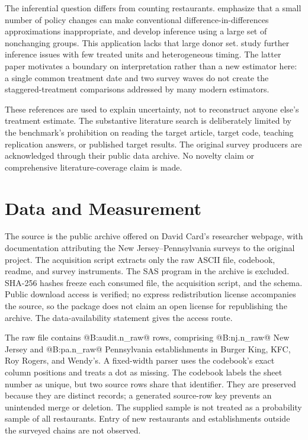 \documentclass[11pt]{article}
\begin{document}
The inferential question differs from counting restaurants. \citet{conley2005} emphasize that a small number of policy changes can make conventional difference-in-differences approximations inappropriate, and develop inference using a large set of nonchanging groups. This application lacks that large donor set. \citet{alvarez2023} study further inference issues with few treated units and heterogeneous timing. The latter paper motivates a boundary on interpretation rather than a new estimator here: a single common treatment date and two survey waves do not create the staggered-treatment comparisons addressed by many modern estimators. %

These references are used to explain uncertainty, not to reconstruct anyone else's treatment estimate. The substantive literature search is deliberately limited by the benchmark's prohibition on reading the target article, target code, teaching replication answers, or published target results. The original survey producers are acknowledged through their public data archive. No novelty claim or comprehensive literature-coverage claim is made. %

\section{Data and Measurement}
The source is the public archive offered on David Card's researcher webpage, with documentation attributing the New Jersey--Pennsylvania surveys to the original project. The acquisition script extracts only the raw ASCII file, codebook, readme, and survey instruments. The SAS program in the archive is excluded. SHA-256 hashes freeze each consumed file, the acquisition script, and the schema. Public download access is verified; no express redistribution license accompanies the source, so the package does not claim an open license for republishing the archive. The data-availability statement gives the access route. %

The raw file contains @B:audit.n_raw@ rows, comprising @B:nj.n_raw@ New Jersey and @B:pa.n_raw@ Pennsylvania establishments in Burger King, KFC, Roy Rogers, and Wendy's. A fixed-width parser uses the codebook's exact column positions and treats a dot as missing. The codebook labels the sheet number as unique, but two source rows share that identifier. They are preserved because they are distinct records; a generated source-row key prevents an unintended merge or deletion. The supplied sample is not treated as a probability sample of all restaurants. Entry of new restaurants and establishments outside the surveyed chains are not observed. %
\end{document}
